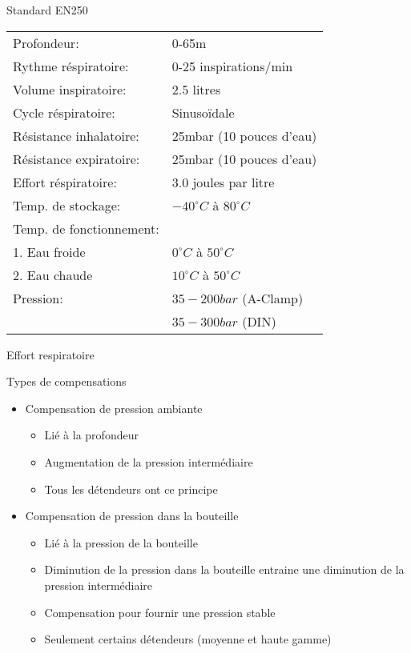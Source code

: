 \documentclass[aspectratio=1610,english,12pt]{beamer}
\begin{document}
\begin{frame}{Standard EN250}
	\begin{tabular}{l l}
		Profondeur: 				& 0-65m\\
		Rythme réspiratoire:			& 0-25 inspirations/min\\
		Volume inspiratoire:			& 2.5 litres\\
		Cycle réspiratoire:			& Sinusoïdale\\
		Résistance inhalatoire:		& 25mbar (10 pouces d'eau)\\
		Résistance expiratoire:		& 25mbar (10 pouces d'eau)\\
		Effort réspiratoire:			& 3.0 joules par litre\\
		Temp. de stockage:			& $-40^{\circ}C$ à $80^{\circ}C$ \\
		Temp. de fonctionnement:	&\\
		1. Eau froide					& $0^{\circ}C$ à $50^{\circ}C$\\
		2. Eau chaude					& $10^{\circ}C$ à $50^{\circ}C$\\
		Pression:						& $35-200 bar$ (A-Clamp)\\
											& $35-300 bar$ (DIN)
	\end{tabular}
\end{frame}

\begin{frame}{Effort respiratoire}
\end{frame}

\begin{frame}{Types de compensations}
	\begin{itemize}
		\item Compensation de pression ambiante
		\begin{itemize}
			\item Lié à la profondeur
			\item Augmentation de la pression intermédiaire
			\item Tous les détendeurs ont ce principe
		\end{itemize}
		\item Compensation de pression dans la bouteille
		\begin{itemize}
			\item Lié à la pression de la bouteille
			\item Diminution de la pression dans la bouteille entraine une diminution de la pression intermédiaire
			\item Compensation pour fournir une pression stable
			\item Seulement certains détendeurs (moyenne et haute gamme)
		\end{itemize}		
	\end{itemize}
\end{frame}
\end{document}

